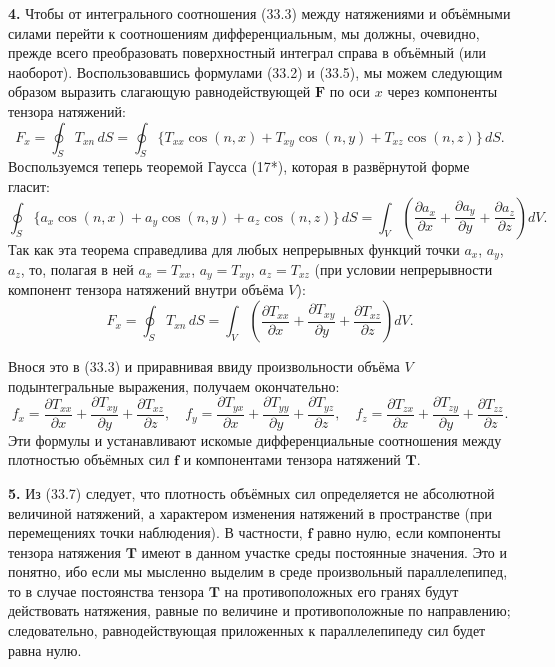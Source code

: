 \documentclass[a4paper,10pt]{article}
\begin{document}
\textbf{4.} Чтобы от интегрального соотношения (33.3) между натяжениями
и объёмными силами перейти к соотношениям дифференциальным, мы должны,
очевидно, прежде всего преобразовать поверхностный интеграл справа
в объёмный (или наоборот). Воспользовавшись формулами (33.2) и (33.5),
мы можем следующим образом выразить слагающую равнодействующей
$\mathbf{F}$ по оси $x$ через компоненты тензора натяжений:
$$
    F_x = \oint_S T_{xn}\,dS
        = \oint_S \{T_{xx}\cos(n,x) + T_{xy}\cos(n,y) + T_{xz}\cos(n,z)\}\,dS.
$$
Воспользуемся теперь теоремой Гаусса (17*), которая в развёрнутой
форме гласит:
$$
    \oint_S \{a_x\cos(n,x) + a_y\cos(n,y) + a_z\cos(n,z)\}\,dS
    = \int_V\!\left(
        \frac{\partial a_x}{\partial x}
      + \frac{\partial a_y}{\partial y}
      + \frac{\partial a_z}{\partial z}
    \right)dV.
$$
Так как эта теорема справедлива для любых непрерывных функций точки
$a_x$, $a_y$, $a_z$, то, полагая в ней $a_x = T_{xx}$, $a_y = T_{xy}$,
$a_z = T_{xz}$ (при условии непрерывности компонент тензора натяжений
внутри объёма $V$):
$$
    F_x = \oint_S T_{xn}\,dS
        = \int_V\!\left(
            \frac{\partial T_{xx}}{\partial x}
          + \frac{\partial T_{xy}}{\partial y}
          + \frac{\partial T_{xz}}{\partial z}
          \right)dV.
$$


Внося это в (33.3) и приравнивая ввиду произвольности объёма $V$
подынтегральные выражения, получаем окончательно:
\begin{equation}
    f_x = \frac{\partial T_{xx}}{\partial x}
        + \frac{\partial T_{xy}}{\partial y}
        + \frac{\partial T_{xz}}{\partial z},
    \quad
    f_y = \frac{\partial T_{yx}}{\partial x}
        + \frac{\partial T_{yy}}{\partial y}
        + \frac{\partial T_{yz}}{\partial z},
    \quad
    f_z = \frac{\partial T_{zx}}{\partial x}
        + \frac{\partial T_{zy}}{\partial y}
        + \frac{\partial T_{zz}}{\partial z}.
    \tag{33.7}
\end{equation}
Эти формулы и устанавливают искомые дифференциальные соотношения между
плотностью объёмных сил $\mathbf{f}$ и компонентами тензора натяжений
$\mathbf{T}$.

\textbf{5.} Из (33.7) следует, что плотность объёмных сил определяется
не абсолютной величиной натяжений, а характером изменения натяжений
в пространстве (при перемещениях точки наблюдения). В частности,
$\mathbf{f}$ равно нулю, если компоненты тензора натяжения $\mathbf{T}$
имеют в данном участке среды постоянные значения. Это и понятно, ибо
если мы мысленно выделим в среде произвольный параллелепипед, то в
случае постоянства тензора $\mathbf{T}$ на противоположных его гранях
будут действовать натяжения, равные по величине и противоположные по
направлению; следовательно, равнодействующая приложенных к
параллелепипеду сил будет равна нулю.
\end{document}
